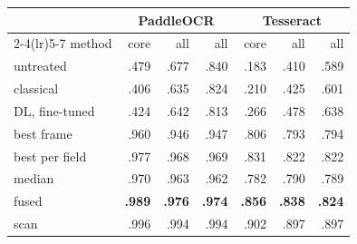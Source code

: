 \begin{tabular}{lrrrrrr}
\toprule
 & \multicolumn{3}{c}{PaddleOCR} & \multicolumn{3}{c}{Tesseract} \\
\cmidrule(lr){2-4}\cmidrule(lr){5-7}
method & core & all & all & core & all & all \\
\midrule
untreated & .479 & .677 & .840 & .183 & .410 & .589 \\
classical & .406 & .635 & .824 & .210 & .425 & .601 \\
DL, fine-tuned & .424 & .642 & .813 & .266 & .478 & .638 \\
best frame & .960 & .946 & .947 & .806 & .793 & .794 \\
best per field & .977 & .968 & .969 & .831 & .822 & .822 \\
median & .970 & .963 & .962 & .782 & .790 & .789 \\
fused & \textbf{.989} & \textbf{.976} & \textbf{.974} & \textbf{.856} & \textbf{.838} & \textbf{.824} \\
\midrule
scan & .996 & .994 & .994 & .902 & .897 & .897 \\
\bottomrule
\end{tabular}

